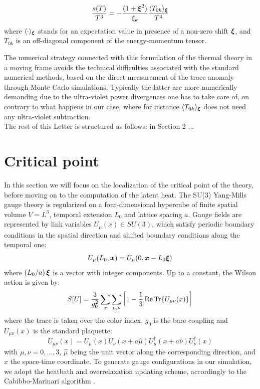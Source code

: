 \documentclass{article}
\begin{document}
\begin{equation}
    \frac{s(T)}{T^3} = - \frac{(1 + \vb*{\xi}^2)}{\xi_k}\frac{\langle T_{0k} \rangle_{\vb*{\xi}}}{T^4}
\end{equation}
where $\langle \cdot \rangle_{\vb*{\xi}}$ stands for an expectation value in presence of a non-zero shift $\vb*{\xi}$, and $T_{0k}$ is an off-diagonal component of the energy-momentum tensor. %

The numerical strategy connected with this formulation of the thermal theory in a moving frame avoids the technical difficulties associated with the standard numerical methods, based on the direct measurement of the trace anomaly through Monte Carlo simulations. Typically the latter are more numerically demanding due to the ultra-violet power divergences one has to take care of, on contrary to what happens in our case, where for instance $\langle T_{0k} \rangle_{\vb*{\xi}}$ does not need any ultra-violet subtraction.
\\ The rest of this Letter is structured as follows: in Section 2 ...

\section{Critical point}
In this section we will focus on the localization of the critical point of the theory, before moving on to the computation of the latent heat. The SU(3) Yang-Mills gauge theory is regularized on a four-dimensional hypercube of finite spatial volume $V = L^3$, temporal extension $L_0$ and lattice spacing $a$. Gauge fields are represented by link variables $U_\mu(x) \in SU(3)$, which satisfy periodic boundary conditions in the spatial direction and shifted boundary conditions along the temporal one:
\begin{equation}
    U_\mu(L_0, \vb*{x}) = U_\mu(0, \vb*{x} - L_0 \vb*{\xi
})
\end{equation}
where $(L_0/a) \, \vb*{\xi}$ is a vector with integer components. Up to a constant, the Wilson action is given by:
\begin{equation}
S[U] = \frac{3}{g_0^2} \sum_x \sum_{\mu, \nu} \left[1 - \frac{1}{3} \Re \Tr{U_{\mu\nu}(x)} \right]
\end{equation}
where the trace is taken over the color index, $g_0$ is the bare coupling and $U_{\mu\nu}(x)$ is the standard plaquette:
\begin{equation}
    U_{\mu\nu}(x) = U_\mu(x)U_\nu(x + a\hat{\mu})U_\mu^\dagger(x + a\hat{\nu})U_\nu^\dagger(x)
\end{equation}
with $\mu, \nu = 0, \dots, 3$, $\hat{\mu}$ being the unit vector along the corresponding direction, and $x$ the space-time coordinate. 
To generate gauge configurations in our simulation, we adopt the heatbath and overrelaxation updating scheme, accordingly to the Cabibbo-Marinari algorithm \cite{Cabibbo:1982zn}.%
\end{document}
